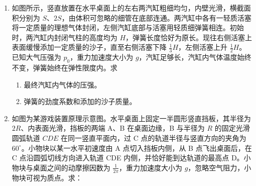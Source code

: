 \documentclass[\gkver]{gaokaozhenti}
\begin{document}
\begin{enumerate}
\item
如图所示，竖直放置在水平桌面上的左右两汽缸粗细均匀，内壁光滑，横截面积分别为 $S$、$2S$，由体积可忽略的细管在底部连通。两汽缸中各有一轻质活塞将一定质量的理想气体封闭，左侧汽缸底部与活塞用轻质细弹簧相连。初始时，两汽缸内封闭气柱的高度均为 $H$，弹簧长度恰好为原长。现往右侧活塞上表面缓慢添加一定质量的沙子，直至右侧活塞下降 $\frac{1}{3}H$，左侧活塞上升 $\frac{1}{2}H$。已知大气压强为 $p_{0}$，重力加速度大小为 $g$，汽缸足够长，汽缸内气体温度始终不变，弹簧始终在弹性限度内。求

\begin{enumerate}
	\item
	最终汽缸内气体的压强。
	\item
	弹簧的劲度系数和添加的沙子质量。
\end{enumerate}


\item
如图为某游戏装置原理示意图。水平桌面上固定一半圆形竖直挡板，其半径为 $2R$、内表面光滑，挡板的两端 A、B 在桌面边缘，B 与半径为 $R$ 的固定光滑圆弧轨道 $CDE$ 在同一竖直平面内，过 C 点的轨道半径与竖直方向的夹角为 $60^\circ$。小物块以某一水平初速度由 A 点切入挡板内侧，从 B 点飞出桌面后，在 C 点沿圆弧切线方向进入轨道 CDE 内侧，并恰好能到达轨道的最高点 D。小物块与桌面之间的动摩擦因数为 $\frac{1}{2\pi}$，重力加速度大小为 $g$，忽略空气阻力，小物块可视为质点。求：


\end{enumerate}
\end{document}
